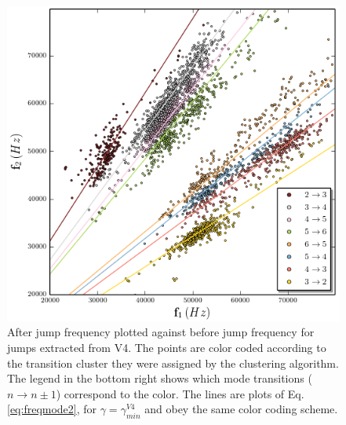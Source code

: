 \documentclass[twocolumn, prl]{revtex4}
\begin{document}
\begin{figure}[!ht]
\centering
\includegraphics[width=\columnwidth]{V4.png}
\caption{\label{fig:jumps}After jump frequency plotted against before jump frequency for jumps extracted from V4. The points are color coded according to the transition cluster they were assigned by the clustering algorithm. The legend in the bottom right shows which mode transitions ($n\rightarrow n\pm1$) correspond to the color. The lines are plots of Eq. \ref{eq:freqmode2}, for $\gamma=\gamma_{min}^{V4}$ and obey the same color coding scheme.} 
\end{figure}
\end{document}
